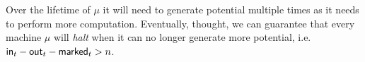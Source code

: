 Over the lifetime of $\mu$ it will need to generate potential multiple times as it needs to perform more computation.
Eventually, thought, we can guarantee that every machine $\mu$ will \textit{halt} when it can no longer generate more potential, i.e.  ${\mathsf {in}}_t - {\mathsf {out}}_t - {\mathsf {marked}}_t > n$.
